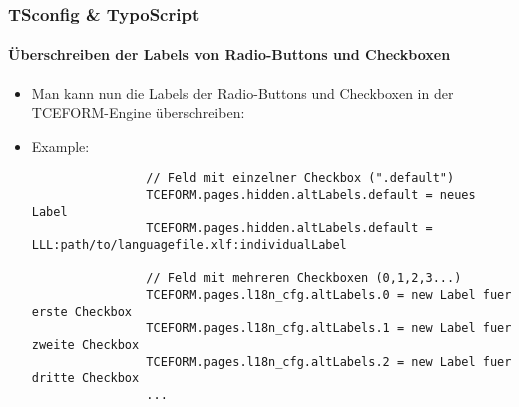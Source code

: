 
\begin{frame}[fragile]
	\frametitle{TSconfig \& TypoScript}
	\framesubtitle{Überschreiben der Labels von Radio-Buttons und Checkboxen}

	\lstset{basicstyle=\tiny\ttfamily}

	\begin{itemize}
		\item Man kann nun die Labels der Radio-Buttons und Checkboxen in der TCEFORM-Engine überschreiben:
		\item Example:

			\begin{lstlisting}
				// Feld mit einzelner Checkbox (".default")
				TCEFORM.pages.hidden.altLabels.default = neues Label
				TCEFORM.pages.hidden.altLabels.default = LLL:path/to/languagefile.xlf:individualLabel

				// Feld mit mehreren Checkboxen (0,1,2,3...)
				TCEFORM.pages.l18n_cfg.altLabels.0 = new Label fuer erste Checkbox
				TCEFORM.pages.l18n_cfg.altLabels.1 = new Label fuer zweite Checkbox
				TCEFORM.pages.l18n_cfg.altLabels.2 = new Label fuer dritte Checkbox
				...
			\end{lstlisting}
		
	\end{itemize}

\end{frame}


